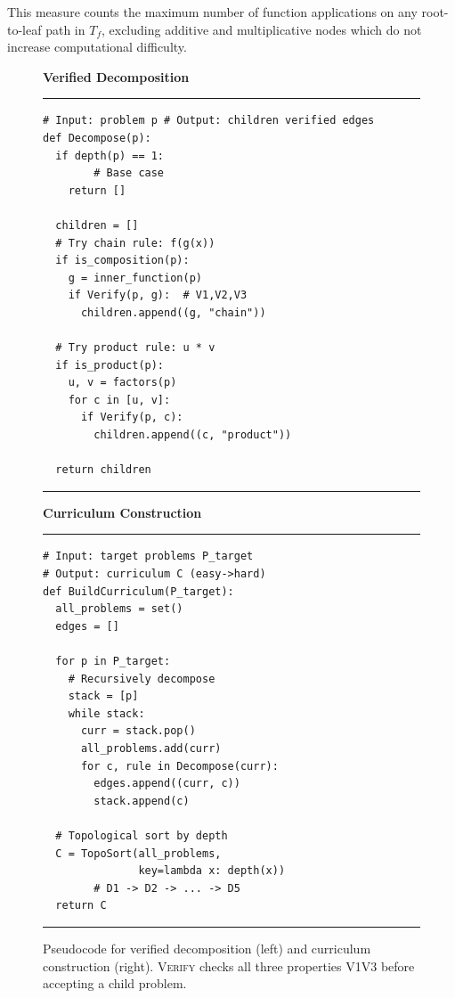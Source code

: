 \documentclass[a4paper,fleqn]{cas-dc}
\theoremstyle{definition}
\begin{document}
\noindent
This measure counts the maximum number of function applications on any root-to-leaf path in $T_f$, excluding additive and multiplicative nodes which do not increase computational difficulty.
\begin{figure}[t]
\centering
\small
\begin{minipage}{1.0\textwidth} %
    \begin{minipage}[t]{0.48\textwidth}
        {\centering \textbf{Verified Decomposition} \par}
        \noindent\rule{\linewidth}{0.4pt}\vspace{-0.5em}
\begin{lstlisting}[style=verifycode]
# Input: problem p # Output: children verified edges
def Decompose(p):
  if depth(p) == 1:  
        # Base case
    return []

  children = []
  # Try chain rule: f(g(x))
  if is_composition(p):
    g = inner_function(p)
    if Verify(p, g):  # V1,V2,V3
      children.append((g, "chain"))

  # Try product rule: u * v
  if is_product(p):
    u, v = factors(p)
    for c in [u, v]:
      if Verify(p, c):
        children.append((c, "product"))

  return children
\end{lstlisting}
        \vspace{-0.5em}
        \noindent\rule{\linewidth}{0.4pt}
    \end{minipage}
    \hfill
    \begin{minipage}[t]{0.48\textwidth}
        {\centering \textbf{Curriculum Construction} \par}
        \noindent\rule{\linewidth}{0.4pt}\vspace{-0.5em}
\begin{lstlisting}[style=verifycode]
# Input: target problems P_target
# Output: curriculum C (easy->hard)
def BuildCurriculum(P_target):
  all_problems = set()
  edges = []

  for p in P_target:
    # Recursively decompose
    stack = [p]
    while stack:
      curr = stack.pop()
      all_problems.add(curr)
      for c, rule in Decompose(curr):
        edges.append((curr, c))
        stack.append(c)

  # Topological sort by depth
  C = TopoSort(all_problems,
               key=lambda x: depth(x))
        # D1 -> D2 -> ... -> D5       
  return C  
\end{lstlisting}
        \vspace{-0.5em}
        \noindent\rule{\linewidth}{0.4pt}
    \end{minipage}
\end{minipage}
\vspace{-0.5em}
\caption{Pseudocode for verified decomposition (left) and curriculum construction (right). \textsc{Verify} checks all three properties V1\textendash V3 before accepting a child problem.}
\label{fig:algorithms}
\end{figure}
\end{document}
